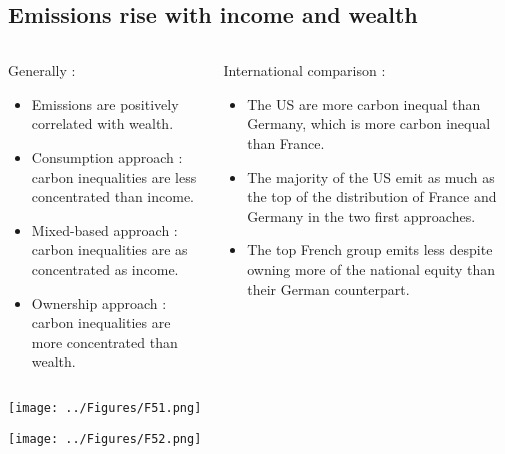 \documentclass{beamer}
\newcommand\ReduceFont{\fontsize{10}{7.2}\selectfont}
\begin{document}
\subsection{Emissions rise with income and wealth}
\begin{frame}{\subsecname}
    \begin{columns}
        \begin{column}{0.5\textwidth}
            Generally :
            \begin{itemize}
                \item Emissions are positively correlated with wealth.
                \item Consumption approach : carbon inequalities are less concentrated than income.
                \item Mixed-based approach : carbon inequalities are as concentrated as income.
                \item Ownership approach : carbon inequalities are more concentrated than wealth.
            \end{itemize}
        \end{column}
        \begin{column}{0.5\textwidth}
            \ReduceFont
            International comparison :
            \begin{itemize}
                \item The US are more carbon inequal than Germany, which is more carbon inequal than France.
                \item The majority of the US emit as much as the top of the distribution of France and Germany in the two first approaches.
                \item The top French group emits less despite owning more of the national equity than their German counterpart.
            \end{itemize}
        \end{column}
    \end{columns}
\end{frame}

\begin{frame}{\subsecname}
    \texttt{[image: ../Figures/F51.png]}
\end{frame}

\begin{frame}{\subsecname}
    \texttt{[image: ../Figures/F52.png]}
\end{frame}
\end{document}
